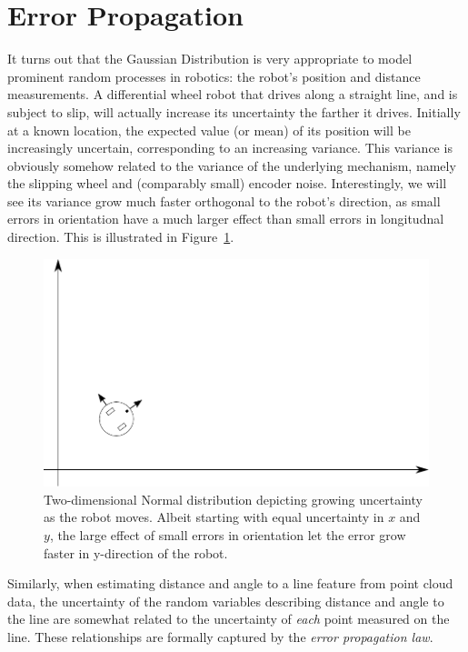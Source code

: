 \section{Error Propagation}\label{sec:errorprop}
It turns out that the Gaussian Distribution is very appropriate to model prominent random processes in robotics: the robot's position and distance measurements. A differential wheel robot that drives along a straight line, and is subject to slip, will actually increase its uncertainty the farther it drives. Initially at a known location, the expected value (or mean) of its position will be increasingly uncertain, corresponding to an increasing variance. This variance is obviously somehow related to the variance of the underlying mechanism, namely the slipping wheel and (comparably small) encoder noise. Interestingly, we will see its variance grow much faster orthogonal to the robot's direction, as small errors in orientation have a much larger effect than small errors in longitudnal direction. This is illustrated in Figure~\ref{fig:errorprop_odometry}.

\begin{figure}
	\centering
		\includegraphics[width=\textwidth]{figs/errorprop_odometry}
	\caption{Two-dimensional Normal distribution depicting growing uncertainty as the robot moves. Albeit starting with equal uncertainty in $x$ and $y$, the large effect of small errors in orientation let the error grow faster in y-direction of the robot.}
	\label{fig:errorprop_odometry}
\end{figure}

Similarly, when estimating distance and angle to a line feature from point cloud data, the uncertainty of the random variables describing distance and angle to the line are somewhat related to the uncertainty of \emph{each} point measured on the line. These relationships are formally captured by the \emph{error propagation law}.

